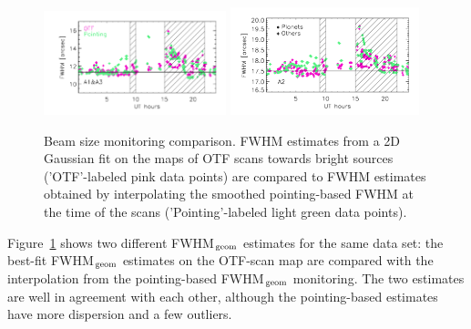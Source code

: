 \begin{figure}[ht!]
  \begin{center}
    \includegraphics[clip=true, trim={0.9cm, 0.5cm, 0.5cm, 0.5cm}, width=0.4725\textwidth]{Figures/Beam_monitoring_with_otfs_vs_ut_compare_pointings_1mm.pdf}
    \includegraphics[clip=true, trim={0.5cm, 0.5cm, 0.5cm, 0.5cm}, width=0.4875\textwidth]{Figures/Beam_monitoring_with_otfs_vs_ut_compare_pointings_a2.pdf}
    \caption[Beam size monitoring comparison]{Beam size monitoring
      comparison. FWHM estimates from a 2D Gaussian fit on the maps
      of OTF scans towards bright sources ('OTF'-labeled pink data
      points) are compared to FWHM estimates obtained by
      interpolating the smoothed pointing-based FWHM at the time of
      the scans ('Pointing'-labeled light green data points).}
\label{fig:beam_monitoring_compare}
\end{center}
\end{figure}
%
Figure~\ref{fig:beam_monitoring_compare} shows two different FWHM$_{\rm{geom}}$
estimates for the same data set: the best-fit FWHM$_{\rm{geom}}$ estimates on
the OTF-scan map are compared with the interpolation from the pointing-based
FWHM$_{\rm{geom}}$ monitoring. The two estimates are well in agreement with each
other, although the pointing-based estimates have more dispersion and
a few outliers.



